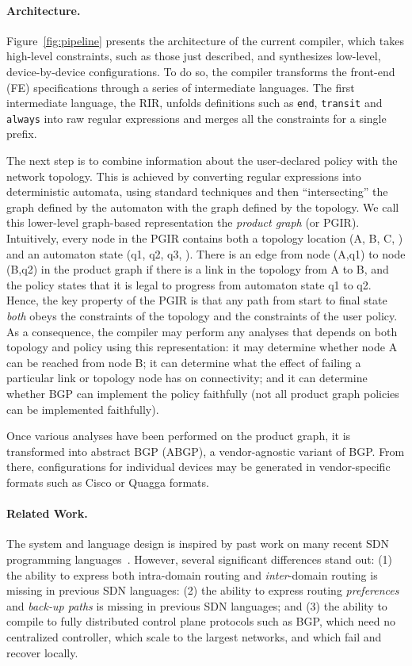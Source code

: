 \paragraph*{Architecture.}
Figure~\ref{fig:pipeline} presents the architecture of the
current \Name compiler, which takes high-level constraints, such as those
just described, and synthesizes low-level, device-by-device configurations.  
To do so, the compiler transforms the front-end (FE) specifications through
a series of intermediate languages.  The first intermediate language, the
RIR, unfolds definitions such as \texttt{end}, \texttt{transit} and \texttt{always} into raw regular expressions and merges all the constraints for a single
prefix.  

The next step is to combine information about
the user-declared policy with the network topology.
This is achieved by converting regular expressions into deterministic
automata, using standard techniques and then ``intersecting'' the graph
defined by the automaton with the graph defined by the topology.
We call this lower-level graph-based representation the \emph{product graph} (or PGIR).
Intuitively, every node in the PGIR contains both a topology location
(A, B, C, \etc) and an automaton state (q1, q2, q3, \etc).  There is an
edge from node (A,q1) to node (B,q2) in the product graph if there is
a link in the topology from A to B, and the \Name policy states that
it is legal to progress from automaton state q1 to q2.  Hence,
the key property of the PGIR is that any path from start to final state
\emph{both} obeys the constraints of the topology and the constraints
of the user policy.  As a consequence, the compiler may perform any
analyses that depends on both topology and policy using this representation:  
it may determine whether node A can be reached from node B; it can determine
what the effect of failing a particular link or topology node has on 
connectivity; and it can determine whether BGP can implement the policy
faithfully (not all product graph policies can be implemented faithfully).

Once various analyses have been performed on the product graph, it is
transformed into abstract BGP (ABGP), a vendor-agnostic variant of BGP.
From there, configurations for individual devices may be generated in
vendor-specific formats such as Cisco or Quagga formats.

\paragraph*{Related Work.}
The \Name system and language design is inspired by past work on many 
recent SDN programming
languages~\cite{frenetic,pyretic,flowlog,foster:merlin,netkat,kinetic,pga}.
However, several significant differences stand out:  (1) the ability to express
both intra-domain routing and \emph{inter}-domain routing is missing in
previous SDN languages: 
(2) the ability to express routing \emph{preferences} and 
\emph{back-up paths} is missing in
previous SDN languages;
and (3) the ability to compile to fully distributed control plane
protocols such as BGP, which need no centralized controller, which
scale to the largest networks, and which fail and recover locally.

